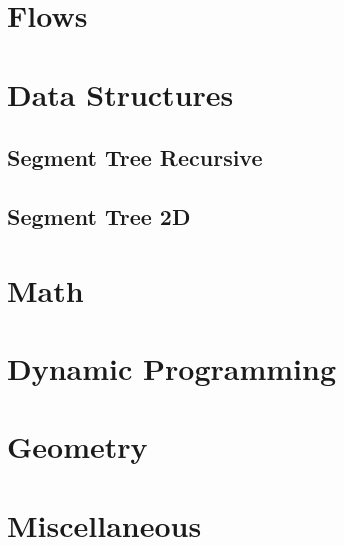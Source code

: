 \section{Flows}

\section{Data Structures}
\subsection{Segment Tree Recursive}
\raggedbottom
\hrulefill
\subsection{Segment Tree 2D}
\raggedbottom
\hrulefill

\section{Math}

\section{Dynamic Programming}

\section{Geometry}

\section{Miscellaneous}

